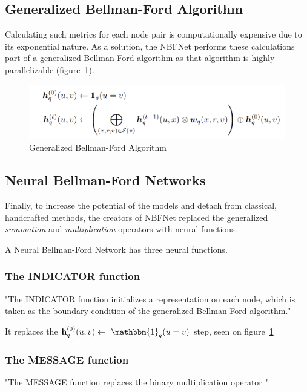 \subsection{Generalized Bellman-Ford Algorithm}\label{subsec:generalized-bellman-ford-algorithm}

Calculating such metrics for each node pair is computationally expensive due to its exponential nature.
As a solution, the NBFNet performs these calculations part of a generalized Bellman-Ford algorithm as that algorithm is highly
parallelizable (figure~\ref{fig:gen-bf}).

\begin{figure}[h] %
    \centering %
    \includegraphics[width=0.8\linewidth]{figures/nbfnet-gen-bf} %
    \caption{Generalized Bellman-Ford Algorithm ~\cite{NBFNet}} %
    \label{fig:gen-bf} %
\end{figure}

\subsection{Neural Bellman-Ford Networks}\label{subsec:neural-bellman-ford-networks}
Finally, to increase the potential of the models and detach from classical, handcrafted methods, the creators of NBFNet replaced
the generalized \textit{summation} and \textit{multiplication} operators with neural functions.

A Neural Bellman-Ford Network has three neural functions.

\subsubsection{The INDICATOR function}
"The INDICATOR function initializes a
representation on each node, which is
taken as the boundary condition of the generalized Bellman-Ford algorithm."~\cite{NBFNet}

It replaces the $\textbf{h}_q^{(0)}(u,v)\leftarrow\ \mathbbm{1}_q(u=v)$ step, seen on figure~\ref{fig:gen-bf}

\subsubsection{The MESSAGE function}
"The MESSAGE function replaces the binary multiplication operator \bigotimes"~\cite{NBFNet}



